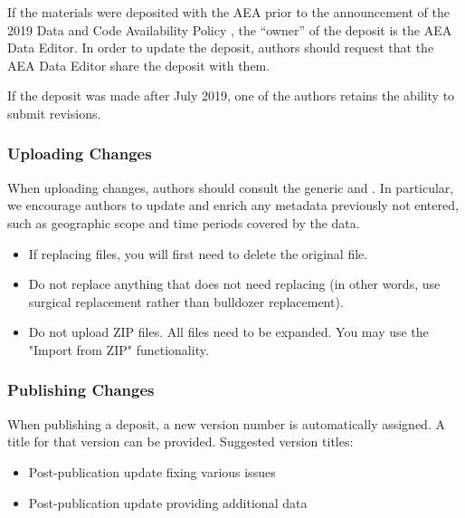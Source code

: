 If the materials were deposited with the AEA prior to the
announcement
of the 2019
Data and Code Availability Policy \citep{10.1257/pandp.110.dcap}, the ``owner'' of the deposit is the
AEA Data Editor. In order to update the deposit, authors should request
that the AEA Data Editor share the deposit with them.

If the deposit was made after July 2019, one of the authors retains the
ability to submit revisions.

\subsubsection{Uploading Changes}\label{uploading-changes}

When uploading changes, authors should consult the generic
 and
. In particular, we encourage authors to update and enrich any
metadata previously not entered, such as geographic scope and time
periods covered by the data.

\begin{itemize}
\tightlist
\item
  If replacing files, you will first need to delete the original file.
\item
  Do not replace anything that does not need replacing (in other words,
  use surgical replacement rather than bulldozer replacement).
\item
  Do not upload ZIP files. All files need to be expanded. You may use
  the "Import from ZIP" functionality.
\end{itemize}

\subsubsection{Publishing Changes}\label{publishing-changes}

When publishing a deposit, a new version number is automatically
assigned. A title for that version can be provided. Suggested version
titles:

\begin{itemize}
\tightlist
\item
  Post-publication update fixing various issues
\item
  Post-publication update providing additional data
\end{itemize}
